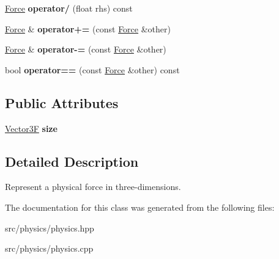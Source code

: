 \begin{DoxyCompactItemize}
\mbox{\hyperlink{class_force}{Force}} {\bfseries operator/} (float rhs) const
\item 
\mbox{\label{class_force_aa10d181ef1e9f7396527b26ed50f0580}} 
\mbox{\hyperlink{class_force}{Force}} \& {\bfseries operator+=} (const \mbox{\hyperlink{class_force}{Force}} \&other)
\item 
\mbox{\label{class_force_a86f714640da87dace348b5b4877d6eb4}} 
\mbox{\hyperlink{class_force}{Force}} \& {\bfseries operator-\/=} (const \mbox{\hyperlink{class_force}{Force}} \&other)
\item 
\mbox{\label{class_force_a2eb13eefe7352a956a230c6a9e5a4c88}} 
bool {\bfseries operator==} (const \mbox{\hyperlink{class_force}{Force}} \&other) const
\end{DoxyCompactItemize}
\subsection*{Public Attributes}
\begin{DoxyCompactItemize}
\item 
\mbox{\label{class_force_a32cb2730ef7c4c0403b193df4cdcb158}} 
\mbox{\hyperlink{class_vector3}{Vector3F}} {\bfseries size}
\end{DoxyCompactItemize}


\subsection{Detailed Description}
Represent a physical force in three-\/dimensions. 

The documentation for this class was generated from the following files\+:\begin{DoxyCompactItemize}
\item 
src/physics/physics.\+hpp\item 
src/physics/physics.\+cpp\end{DoxyCompactItemize}
